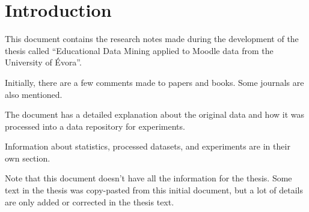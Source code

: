 \chapter{Introduction}

This document contains the research notes made during the development of the
thesis called ``Educational Data Mining applied to Moodle data from the
University of Évora''.

Initially, there are a few comments made to papers and books. Some journals are
also mentioned.

The document has a detailed explanation about the original data and how it was
processed into a data repository for experiments.

Information about statistics, processed datasets, and experiments are in their
own section.

Note that this document doesn't have all the information for the thesis. Some
text in the thesis was copy-pasted from this initial document, but a lot of
details are only added or corrected in the thesis text.
